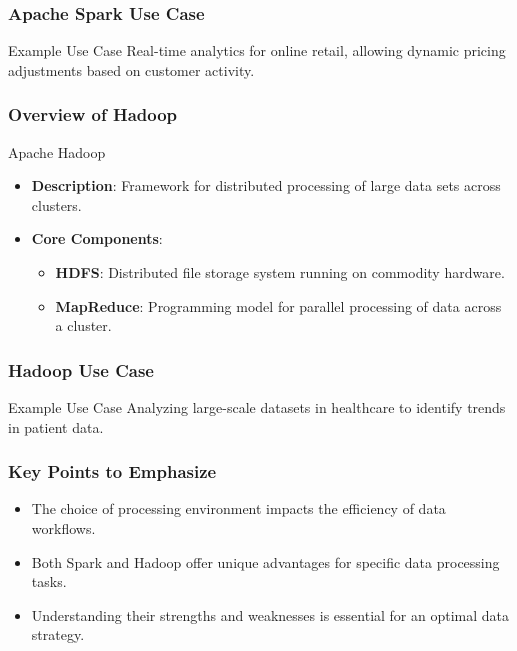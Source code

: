 \documentclass{beamer}
\begin{document}
\begin{frame}
    \frametitle{Apache Spark Use Case}
    \begin{block}{Example Use Case}
        Real-time analytics for online retail, allowing dynamic pricing adjustments based on customer activity.
    \end{block}
\end{frame}

\begin{frame}
    \frametitle{Overview of Hadoop}
    \begin{block}{Apache Hadoop}
        \begin{itemize}
            \item \textbf{Description}: Framework for distributed processing of large data sets across clusters.
            \item \textbf{Core Components}:
            \begin{itemize}
                \item \textbf{HDFS}: Distributed file storage system running on commodity hardware.
                \item \textbf{MapReduce}: Programming model for parallel processing of data across a cluster.
            \end{itemize}
        \end{itemize}
    \end{block}
\end{frame}

\begin{frame}
    \frametitle{Hadoop Use Case}
    \begin{block}{Example Use Case}
        Analyzing large-scale datasets in healthcare to identify trends in patient data.
    \end{block}
\end{frame}

\begin{frame}
    \frametitle{Key Points to Emphasize}
    \begin{itemize}
        \item The choice of processing environment impacts the efficiency of data workflows.
        \item Both Spark and Hadoop offer unique advantages for specific data processing tasks.
        \item Understanding their strengths and weaknesses is essential for an optimal data strategy.
    \end{itemize}
\end{frame}
\end{document}
